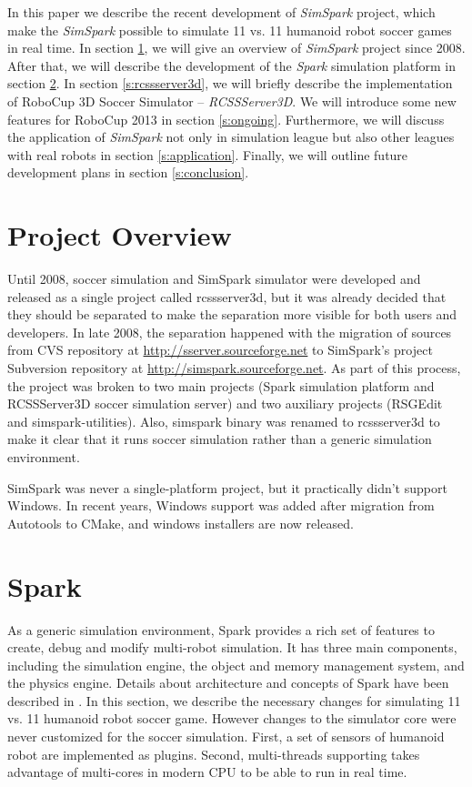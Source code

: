 \documentclass{llncs}
\begin{document}
In this paper we describe the recent development of \textit{SimSpark} project, which make the \textit{SimSpark} possible to simulate 11 vs. 11 humanoid robot soccer games in real time.
In section \ref{s:overview}, we will give an overview of \textit{SimSpark} project since 2008. After that, we will describe the development of the \textit{Spark} simulation platform in section \ref{s:spark}.
In section \ref{s:rcssserver3d}, we will briefly describe the implementation of RoboCup 3D Soccer Simulator -- \textit{RCSSServer3D}.
We will introduce some new features for RoboCup 2013 in section \ref{s:ongoing}.
Furthermore, we will discuss the application of \textit{SimSpark} not only in simulation league but also other leagues with real robots in section \ref{s:application}.
Finally, we will outline future development plans in section \ref{s:conclusion}.

\section{Project Overview}
\label{s:overview}

Until 2008, soccer simulation and SimSpark simulator were developed and released as a single project called rcssserver3d, but it was already decided that they should be separated 
to make the separation more visible for both users and developers.
In late 2008, the separation happened with the migration of sources from CVS repository
at \url{http://sserver.sourceforge.net} to SimSpark's project Subversion repository at 
\url{http://simspark.sourceforge.net}. As part of this process, the project was broken
to two main projects (Spark simulation platform and RCSSServer3D soccer simulation server) 
and two auxiliary projects (RSGEdit and simspark-utilities). Also, simspark binary was 
renamed to rcssserver3d to make it clear that it runs soccer simulation rather than a 
generic simulation environment.

SimSpark was never a single-platform project, but it practically didn't support 
Windows. In recent years, Windows support was added after migration from Autotools
to CMake, and windows installers are now released. 

\section{Spark}
\label{s:spark}
As a generic simulation environment, Spark provides a rich set of features to create, debug and modify multi-robot simulation.
It has three main components, including the simulation engine, the object and memory management system, and the physics engine. Details about architecture and concepts of Spark have been described in \cite{Boedecker2008,OR05}.
In this section, we describe the necessary changes for simulating 11 vs. 11 humanoid robot soccer game.
However changes to the simulator core were never customized for the soccer simulation.
First, a set of sensors of humanoid robot are implemented as plugins. Second, multi-threads supporting takes advantage of multi-cores in modern CPU to be able to run in real time.
\end{document}
